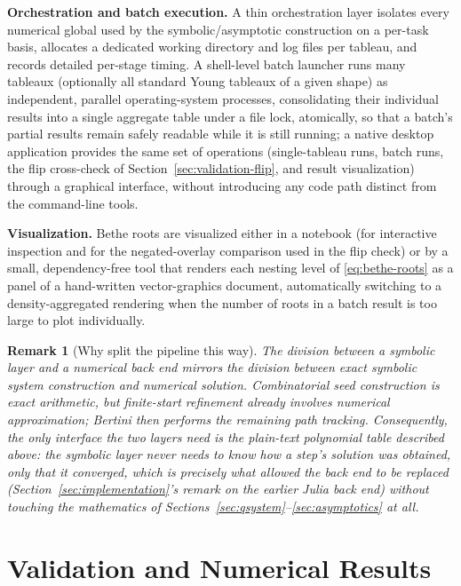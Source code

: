 \documentclass[11pt]{article}
\newtheorem{remark}{Remark}[section]
\begin{document}
\textbf{Orchestration and batch execution.} A thin orchestration layer
isolates every numerical global used by the symbolic/asymptotic
construction on a per-task basis, allocates a dedicated working directory
and log files per tableau, and records detailed per-stage timing. A
shell-level batch launcher runs many tableaux (optionally all standard
Young tableaux of a given shape) as independent, parallel operating-system
processes, consolidating their individual results into a single aggregate
table under a file lock, atomically, so that a batch's partial results
remain safely readable while it is still running; a native desktop
application provides the same set of operations (single-tableau runs,
batch runs, the flip cross-check of Section~\ref{sec:validation-flip}, and
result visualization) through a graphical interface, without introducing
any code path distinct from the command-line tools.

\textbf{Visualization.} Bethe roots are visualized either in a notebook
(for interactive inspection and for the negated-overlay comparison used in
the flip check) or by a small, dependency-free tool that renders each
nesting level of \eqref{eq:bethe-roots} as a panel of a hand-written
vector-graphics document, automatically switching to a density-aggregated
rendering when the number of roots in a batch result is too large to plot
individually.

\begin{remark}[Why split the pipeline this way]
The division between a symbolic layer and a numerical back end mirrors the
division between exact symbolic system construction and numerical solution.
Combinatorial seed construction is exact arithmetic, but finite-start
refinement already involves numerical approximation; Bertini then
performs the remaining path tracking. Consequently, the only interface the two layers
need is the plain-text polynomial table described above: the symbolic
layer never needs to know \emph{how} a step's solution was obtained, only
that it converged, which is precisely what allowed the back end to be
replaced (Section~\ref{sec:implementation}'s remark on the earlier Julia
back end) without touching the mathematics of
Sections~\ref{sec:qsystem}--\ref{sec:asymptotics} at all.
\end{remark}


\section{Validation and Numerical Results}
\label{sec:results}
\end{document}
